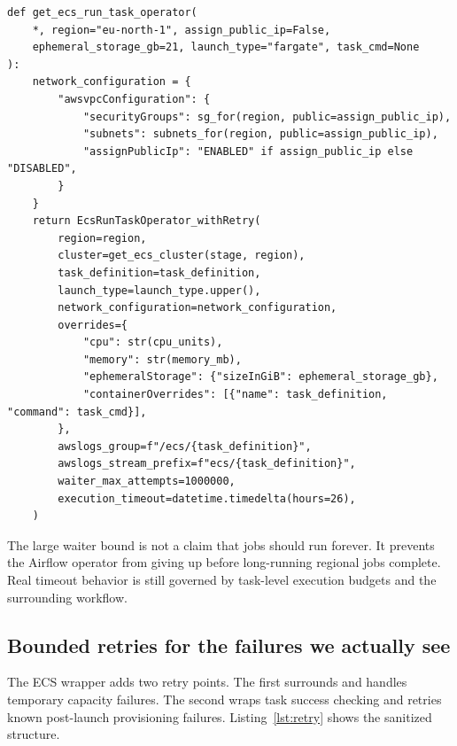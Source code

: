 \documentclass[11pt, reqno]{amsart}
\newcommand{\code}[1]{\texttt{\detokenize{#1}}}
\begin{document}
\begin{lstlisting}[style=python,caption={Sanitized launch factory. Region decides cluster, networking, task sizing, and log group.},label={lst:launch}]
def get_ecs_run_task_operator(
    *, region="eu-north-1", assign_public_ip=False,
    ephemeral_storage_gb=21, launch_type="fargate", task_cmd=None
):
    network_configuration = {
        "awsvpcConfiguration": {
            "securityGroups": sg_for(region, public=assign_public_ip),
            "subnets": subnets_for(region, public=assign_public_ip),
            "assignPublicIp": "ENABLED" if assign_public_ip else "DISABLED",
        }
    }
    return EcsRunTaskOperator_withRetry(
        region=region,
        cluster=get_ecs_cluster(stage, region),
        task_definition=task_definition,
        launch_type=launch_type.upper(),
        network_configuration=network_configuration,
        overrides={
            "cpu": str(cpu_units),
            "memory": str(memory_mb),
            "ephemeralStorage": {"sizeInGiB": ephemeral_storage_gb},
            "containerOverrides": [{"name": task_definition, "command": task_cmd}],
        },
        awslogs_group=f"/ecs/{task_definition}",
        awslogs_stream_prefix=f"ecs/{task_definition}",
        waiter_max_attempts=1000000,
        execution_timeout=datetime.timedelta(hours=26),
    )
\end{lstlisting}

The large waiter bound is not a claim that jobs should run forever. It prevents the Airflow operator from giving up before long-running regional jobs complete. Real timeout behavior is still governed by task-level execution budgets and the surrounding workflow.

\clearpage
\subsection{Bounded retries for the failures we actually see}

The ECS wrapper adds two retry points. The first surrounds \code{RunTask} and handles temporary capacity failures. The second wraps task success checking and retries known post-launch provisioning failures. Listing~\ref{lst:retry} shows the sanitized structure.
\end{document}
